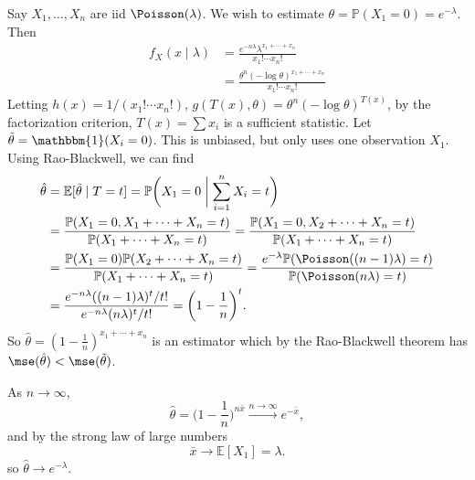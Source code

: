 \documentclass[12pt]{article}
\begin{document}
\begin{exbox}
	Say $X_1, \ldots, X_n$ are iid $\Poisson(\lambda)$. We wish to estimate $\theta = \mathbb{P}(X_1 = 0) = e^{-\lambda}$. Then
	\begin{align*}
		f_X(x \mid \lambda) &= \frac{e^{-n \lambda}\lambda^{x_1 + \cdots + x_n}}{x_1! \cdots x_n!} \\
				    &= \frac{\theta^{n} (- \log \theta)^{x_1 + \cdots + x_n}}{x_1! \cdots x_n!}
	\end{align*}
	Letting $h(x) = 1/(x_1! \cdots x_n!)$, $g(T(x), \theta) = \theta^{n}(- \log \theta)^{T(x)}$, by the factorization criterion, $T(x) = \sum x_i$ is a sufficient statistic.
	Let $\tilde \theta = \mathbbm{1}(X_i = 0)$. This is unbiased, but only uses one observation $X_1$. Using Rao-Blackwell, we can find
	\begin{align*}
		\hat \theta &= \mathbb{E}[\tilde \theta \mid T = t] = \mathbb{P}\biggl(X_1 = 0 \biggm| \sum_{i= 1}^{n} X_i = t\biggr) \\
			    &= \frac{\mathbb{P}(X_1 = 0, X_1 + \cdots + X_n = t)}{\mathbb{P}(X_1 + \cdots + X_n = t)} = \frac{\mathbb{P}(X_1 = 0, X_2 + \cdots + X_n = t)}{\mathbb{P}(X_1 + \cdots + X_n = t)} \\
			    &= \frac{\mathbb{P}(X_1 = 0) \mathbb{P}(X_2 + \cdots + X_n = t)}{\mathbb{P}(X_1 + \cdots + X_n = t)} = \frac{e^{-\lambda} \mathbb{P}(\Poisson((n-1) \lambda) = t)}{\mathbb{P}(\Poisson(n \lambda) = t)} \\
			    &= \frac{e^{-n \lambda} ((n-1)\lambda)^{t}/t!}{e^{-n \lambda} (n \lambda)^{t}/t!} = \biggl( 1 - \frac{1}{n} \biggr)^{t}.
	\end{align*}
	So $\hat \theta = (1 - \frac{1}{n})^{x_1 + \cdots + x_n}$ is an estimator which by the Rao-Blackwell theorem has $\mse(\hat \theta) < \mse(\tilde \theta)$.

	As $n \to \infty$,
	\[
		\hat \theta = \biggl(1 - \frac{1}{n} \biggr)^{n \bar x} \overset{n \to \infty}{\to} e^{-\bar x}
	,\]
	and by the strong law of large numbers
	\[
	\bar x \to \mathbb{E}[X_1] = \lambda
	.\]
	so $\hat \theta \to e^{-\lambda}$.
\end{exbox}
\end{document}

